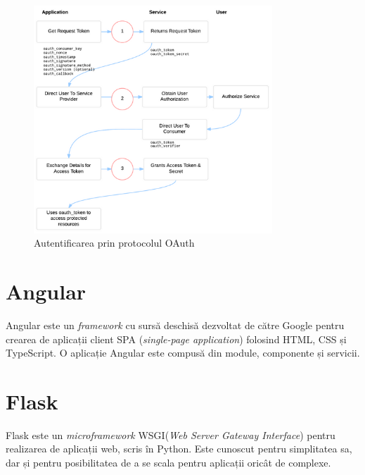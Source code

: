  
 \begin{figure}[!htbp]
    \begin{center}
        \includegraphics[width=0.8\textwidth]{images/oauth.png}
        \caption{Autentificarea prin protocolul OAuth\cite{oauth-bible}}
    \end{center}
\end{figure}

\section{Angular}
Angular este un \textit{framework} cu sursă deschisă dezvoltat de către Google pentru crearea de aplicații client  SPA (\textit{single-page application}) folosind HTML, CSS și TypeScript. O aplicație Angular este compusă din module, componente și servicii.

\section{Flask}
Flask este un \textit{microframework} WSGI(\textit{Web Server Gateway Interface}) pentru realizarea de aplicații web, scris în Python. Este cunoscut pentru simplitatea sa, dar și pentru posibilitatea de a se scala pentru aplicații oricât de complexe.

